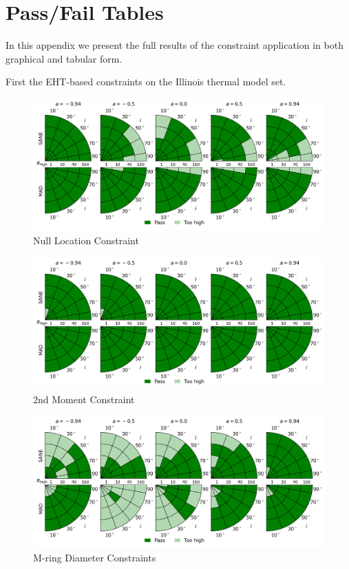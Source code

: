 \section{Pass/Fail Tables}\label{app:tables}


In this appendix we present the full results of the constraint application in both graphical and tabular form.  

First the EHT-based constraints on the Illinois thermal model set.


\begin{figure}
  \centering
  \includegraphics[width=\textwidth]{./figures/Null_loc_Constraints.png}
  \caption{Null Location Constraint}
  \label{fig:null_pizza}
\end{figure}
\begin{figure}
  \centering
  \includegraphics[width=\textwidth]{./figures/230GHz_size_Constraints.png}
  \caption{2nd Moment Constraint}
  \label{fig:230GHz_size_pizza}
\end{figure}
\begin{figure}
  \centering
  \includegraphics[width=\textwidth]{./figures/Mring_d_Constraints.png}
  \caption{M-ring Diameter Constraints}
  \label{fig:mring_diam_pizza}
\end{figure}
